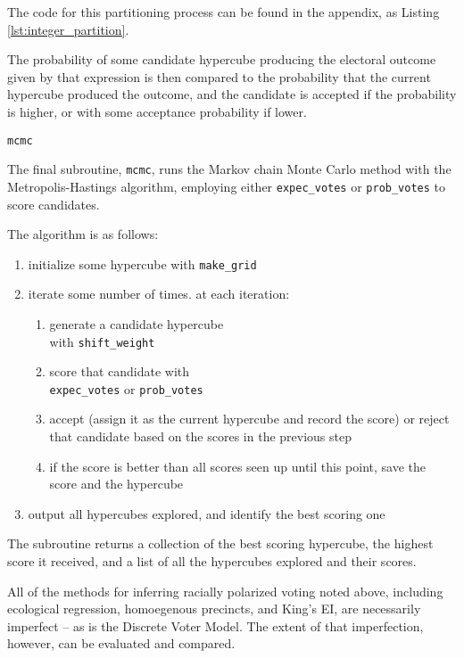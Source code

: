 The code for this partitioning process can be found in the appendix, as Listing \ref{lst:integer_partition}.

The probability of some candidate hypercube producing the electoral outcome given by that expression is then compared to the probability that the current hypercube produced the outcome, and the candidate is accepted if the probability is higher, or with some acceptance probability if lower.


\texttt{mcmc}


The final subroutine, \texttt{mcmc}, runs the Markov chain Monte Carlo method with the Metropolis-Hastings algorithm, employing either \texttt{expec\_votes} or \texttt{prob\_votes} to score candidates.

The algorithm is as follows:

\begin{enumerate}
  \item initialize some hypercube with \texttt{make\_grid}
  \item iterate some number of times. at each iteration:
  \begin{enumerate}
    \item generate a candidate hypercube \\ with \texttt{shift\_weight}
    \item score that candidate with \\ \texttt{expec\_votes} or \texttt{prob\_votes}
    \item accept (assign it as the current hypercube and record the score) or reject that candidate based on the scores in the previous step
    \item if the score is better than all scores seen up until this point, save the score and the hypercube
  \end{enumerate}
  \item output all hypercubes explored, and identify the best scoring one
\end{enumerate}

The subroutine returns a collection of the best scoring hypercube, the highest score it received, and a list of all the hypercubes explored and their scores.



All of the methods for inferring racially polarized voting noted above, including ecological regression, homoegenous precincts, and King's EI, are necessarily imperfect -- as is the Discrete Voter Model. The extent of that imperfection, however, can be evaluated and compared.

